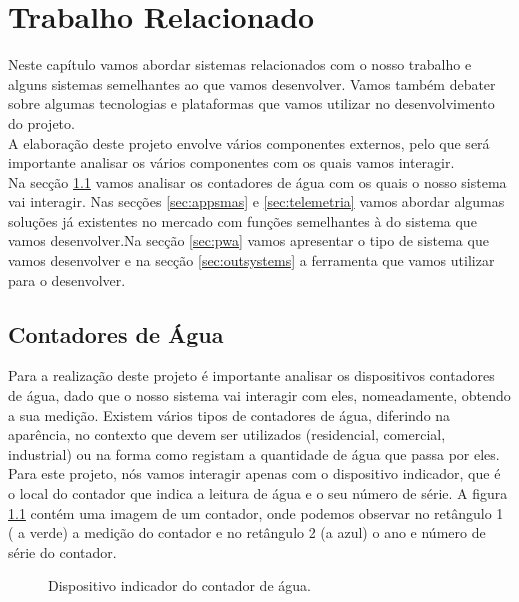 %
%
\chapter{Trabalho Relacionado} \label{cap:trabrelacionado}
Neste capítulo vamos abordar sistemas relacionados com o nosso trabalho e alguns sistemas semelhantes ao que vamos desenvolver. Vamos também debater sobre algumas tecnologias e plataformas que vamos utilizar no desenvolvimento do projeto.\\
A elaboração deste projeto envolve vários componentes externos, pelo que será importante analisar os vários componentes com os quais vamos interagir.\\
Na secção \ref{sec:cont} vamos analisar os contadores de água com os quais o nosso sistema vai interagir. Nas secções \ref{sec:appsmas} e \ref{sec:telemetria} vamos abordar algumas soluções já existentes no mercado com funções semelhantes à do sistema que vamos desenvolver.Na secção \ref{sec:pwa} vamos apresentar o tipo de sistema que vamos desenvolver e na secção \ref{sec:outsystems} a ferramenta que vamos utilizar para o desenvolver.


\section{Contadores de Água} \label{sec:cont}
Para a realização deste projeto é importante analisar os dispositivos contadores de água, dado que o nosso sistema vai interagir com eles, nomeadamente, obtendo a sua medição.
Existem vários tipos de contadores de água, diferindo na aparência, no contexto que devem ser utilizados (residencial, comercial, industrial) ou na forma como registam a quantidade de água que passa por eles. Para este projeto, nós vamos interagir apenas com o dispositivo indicador, que é o local do contador que indica a leitura de água e o seu número de série.
A figura \ref{fig:contador} contém uma imagem de um contador, onde podemos observar no retângulo 1 ( a verde) a medição do contador e no retângulo 2 (a azul) o ano e número de série do contador.

\begin{figure}[h!]
\begin{center}
\caption{Dispositivo indicador do contador de água.}
\label{fig:contador}
\end{center}
\end{figure}


